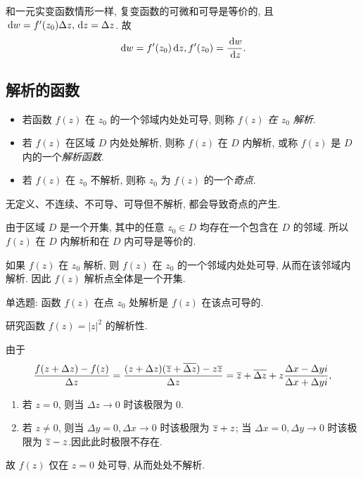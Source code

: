 和一元实变函数情形一样, 复变函数的可微和可导是等价的, 且 $\,\mathrm{d} w=f'(z_0)\Delta z, \,\mathrm{d} z=\Delta z$.
故
  \[\,\mathrm{d} w=f'(z_0)\,\mathrm{d} z, f'(z_0)=\dfrac{\,\mathrm{d} w}{\,\mathrm{d} z}.\]


\subsection{解析的函数}

\begin{definition}[解析和奇点]
	\begin{itemize}
		\item 若函数 $f(z)$ 在 $z_0$ 的一个邻域内处处可导, 则称 \emph{$f(z)$ 在 $z_0$ 解析}.
		\item 若 $f(z)$ 在区域 $D$ 内处处解析, 则称 $f(z)$ 在 $D$ 内解析, 或称 $f(z)$ 是 $D$ 内的一个\emph{解析函数}.
		\item 若 $f(z)$ 在 $z_0$ 不解析, 则称 $z_0$ 为 $f(z)$ 的一个\emph{奇点}.
	\end{itemize}
\end{definition}

无定义、不连续、不可导、可导但不解析, 都会导致奇点的产生.

由于区域 $D$ 是一个开集, 其中的任意 $z_0\in D$ 均存在一个包含在 $D$ 的邻域. 所以 \alert{$f(z)$ 在 $D$ 内解析和在 $D$ 内可导是等价的}.

如果 $f(z)$ 在 $z_0$ 解析, 则 $f(z)$ 在 $z_0$ 的一个邻域内处处可导, 从而在该邻域内解析. 因此 \alert{$f(z)$ 解析点全体是一个开集}.

\begin{exercise}
	单选题: 函数 $f(z)$ 在点 $z_0$ 处解析是 $f(z)$ 在该点可导的\fillbrace{}.
\end{exercise}

\begin{example}
	研究函数 $f(z)=|z|^2$ 的解析性.
\end{example}
\begin{solution}
	由于
	\[
		\frac{f(z+\Delta z)-f(z)}{\Delta z}
		=\frac{(z+\Delta z)(\overline z+\overline{\Delta z})-z\overline z}{\Delta z}
		=\overline z+\overline{\Delta z}+z\frac{\Delta x-\Delta yi}{\Delta x+\Delta yi},
	\]
  \begin{enumerate}
    \item 若 $z=0$, 则当 $\Delta z\to 0$ 时该极限为 $0$.
    \item 若 $z\neq0$, 则当 $\Delta y=0,\Delta x\to 0$ 时该极限为 $\overline z+z$; 当 $\Delta x=0,\Delta y\to 0$ 时该极限为 $\overline z-z$.因此此时极限不存在.
  \end{enumerate}
	故 $f(z)$ 仅在 $z=0$ 处可导, 从而处处不解析.
\end{solution}


